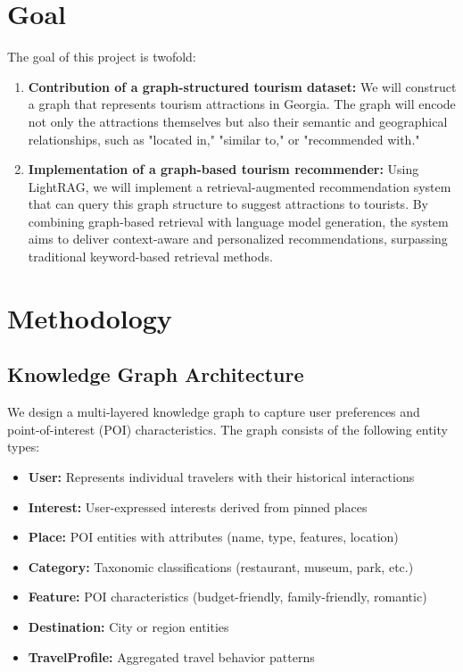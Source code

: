 \documentclass{article} %
\begin{document}
\section{Goal}

The goal of this project is twofold:

\begin{enumerate}
    \item \textbf{Contribution of a graph-structured tourism dataset:} We will construct a graph that represents tourism attractions in Georgia. The graph will encode not only the attractions themselves but also their semantic and geographical relationships, such as "located in," "similar to," or "recommended with."

    \item \textbf{Implementation of a graph-based tourism recommender:} Using LightRAG, we will implement a retrieval-augmented recommendation system that can query this graph structure to suggest attractions to tourists. By combining graph-based retrieval with language model generation, the system aims to deliver context-aware and personalized recommendations, surpassing traditional keyword-based retrieval methods.
\end{enumerate}

\section{Methodology}

\subsection{Knowledge Graph Architecture}

We design a multi-layered knowledge graph to capture user preferences and point-of-interest (POI) characteristics. The graph consists of the following entity types:

\begin{itemize}
    \item \textbf{User:} Represents individual travelers with their historical interactions
    \item \textbf{Interest:} User-expressed interests derived from pinned places
    \item \textbf{Place:} POI entities with attributes (name, type, features, location)
    \item \textbf{Category:} Taxonomic classifications (restaurant, museum, park, etc.)
    \item \textbf{Feature:} POI characteristics (budget-friendly, family-friendly, romantic)
    \item \textbf{Destination:} City or region entities
    \item \textbf{TravelProfile:} Aggregated travel behavior patterns
\end{itemize}
\end{document}
